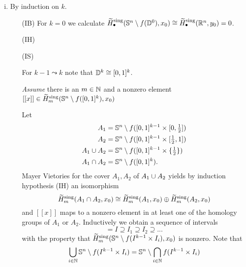 	\begin{sketch}
		\begin{enumerate}[(i)]
			\item{
				By induction on $k$.
				\begin{enumerate}
					\item[(IB)]{
						For $k=0$ we calculate $\widetilde{H}_\bullet^\text{sing}(\S^n \setminus f(\D^0),x_0) \isom \widetilde{H}_\bullet^\text{sing}(\R^n,y_0) = 0$.
					}
					\item[(IH)]{
					}
					\item[(IS)]{
						For $k-1 \leadsto k$ note that $\D^k \isom [0,1]^k$.

						\textit{Assume} there is an $m \in \N$ and a nonzero element $[[x]] \in \widetilde{H}_m^\text{sing}(\S^n \setminus f([0,1]^k),x_0)$
						\begin{tab}[1.3cm]
							Let\vspace{-2.2em}
							\begin{align*}
								A_1 &= \S^n \setminus f([0,1]^{k-1}\times[0,\tfrac{1}{2}])\\
								A_2 &= \S^n \setminus f([0,1]^{k-1}\times[\tfrac{1}{2},1])\\
								A_1 \union A_2 &= \S^n \setminus f([0,1]^{k-1}\times\{\tfrac{1}{2}\})\\
								A_1 \intersection A_2 &= \S^n \setminus f([0,1]^k).
							\end{align*}
							Mayer Vietories for the cover $A_1, A_2$ of $A_1 \union A_2$ yields by induction hypothesis (IH) an isomorphism 
							\begin{equation*}
								\widetilde{H}_m^\text{sing}(A_1 \intersection A_2,x_0) \isom \widetilde{H}_m^\text{sing}(A_1,x_0) \oplus \widetilde{H}_m^\text{sing}(A_2,x_0)
							\end{equation*}
							and $[[x]]$ maps to a nonzero element in at least one of the homology groups of $A_1$ or $A_2$.
							Inductively we obtain a sequence of intervals 
							\begin{equation*}
								[0,1] = I \supseteq I_1 \supseteq I_2 \supseteq ... 
							\end{equation*}
							with the property that $\widetilde{H}_m^\text{sing}(\S^n \setminus f(I^{k-1}\times I_i),x_0)$ is nonzero.  Note that
							\begin{align*}
								\Union \limits_{i \in \N} \S^n\setminus f(I^{k-1} \times I_i) &= \S^n \setminus \Intersection \limits_{i \in \N} f(I^{k-1} \times I_i)\\ 

\end{align*}
\end{tab}}
\end{enumerate}}
\end{enumerate}
\end{sketch}
